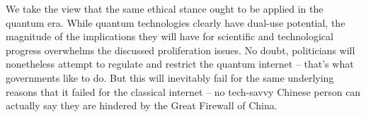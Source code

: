 We take the view that the same ethical stance ought to be applied in the quantum era. While quantum technologies clearly have dual-use potential, the magnitude of the implications they will have for scientific and technological progress overwhelms the discussed proliferation issues. No doubt, politicians will nonetheless attempt to regulate and restrict the quantum internet -- that's what governments like to do. But this will inevitably fail for the same underlying reasons that it failed for the classical internet -- no tech-savvy Chinese person can actually say they are hindered by the Great Firewall of China\texttrademark.

